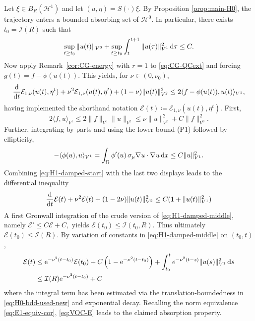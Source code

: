 \documentclass[12pt,leqno]{amsart}
\def\e{{\rm e}}
\def\d{{\rm d}}
\theoremstyle{definition}
\numberwithin{equation}{section}
\numberwithin{figure}{section}
\begin{document}
Let $\xi\in B_R(\mathcal H^1)$ and let $(u,\eta)=S(\cdot)\xi$. By Proposition \ref{prop:main-H0},
the trajectory enters a bounded absorbing set of $\mathcal H^0$. In particular, there exists $t_0=\mathcal I(R)$ such that
\begin{equation}\label{eq:H0-bdd-used-new}
\sup_{t\ge t_0}\|u(t)\|_{V^0}
+
\sup_{t\ge t_0}\int_t^{t+1}\|u(\tau)\|_{{V^1}}^2\,\d\tau \le C. 
\end{equation}
Now apply Remark~\ref{cor:CG-energy} with $r=1$ to \eqref{eq:CG-QCext} and forcing
$g(t)=f-\phi(u(t))$. This yields, for $\nu\in(0,\nu_0)$,
\begin{equation}\label{eq:H1-damped-start}
\frac{\d}{\d t}\mathcal E_{1,\nu}(u(t),\eta^t)+\nu^2\mathcal E_{1,\nu}(u(t),\eta^t) + (1-\nu) \|u(t)\|_{{V^2}}^2
\le 2 \langle f-\phi(u(t)),u(t)\rangle_{{V^1}},
\end{equation}
having implemented the shorthand notation $\mathcal E(t)\coloneqq \mathcal E_{1,\nu}(u(t),\eta^t).$
First, 
\[ 2
\langle f ,u\rangle_{{V^1}}
\le 2\|f\|_{V^0}\|u\|_{{V^2}} \leq \nu \|u\|_{{V^2}}^2 + C \|f\|_{V^0}^2.
\]
Further, integrating by parts and using the lower bound (P1) followed by ellipticity, 
\begin{equation}\label{eq:phi-H1-split}
-\langle \phi(u),u\rangle_{{V^1}} = 
\int_\Omega \phi'(u)\,\sigma_\mu\nabla u\cdot\nabla u\,\d x \leq C\|u\|_{{V^1}}^2.
\end{equation} Combining \eqref{eq:H1-damped-start} with the last two displays leads to the differential inequality
\begin{equation}\label{eq:H1-damped-middle}
\frac{\d}{\d t}\mathcal E(t)+\nu^2\mathcal E(t)+ (1-2\nu) \|u(t)\|_{{V^2}}^2
\le  C   (1+ \|u(t)\|_{{V^1}}^2)
\end{equation} 
A first Gronwall integration of the crude version of \eqref{eq:H1-damped-middle}, namely $\mathcal E'\leq C \mathcal E +C,$ yields $ \mathcal E(t_0) \leq  \mathcal I(t_0,R)$. Thus ultimately $\mathcal E(t_0) \leq  \mathcal I(R)$.
By variation of constants in \eqref{eq:H1-damped-middle}  on $(t_0,t)$,
\begin{equation}\label{eq:VOC-E}
\begin{split}
\mathcal E(t)&\le \e^{-\nu^2(t-t_0)}\mathcal E(t_0)+C\left(1-\e^{-\nu^2(t-t_0)}\right)+\int_{t_0}^t e^{-\nu^2(t-s)}\|u(s)\|_{{V^1}}^2\,\d s 
\\ &\leq \mathcal I(R) \e^{-\nu^2(t-t_0)} + C
\end{split}
\end{equation}
where the integral term has been estimated via the translation-boundedness in \eqref{eq:H0-bdd-used-new} and exponential decay.
Recalling the norm equivalence \eqref{eq:E1-equiv-cor}, \eqref{eq:VOC-E} leads to the claimed absorption property.  
\end{document}
